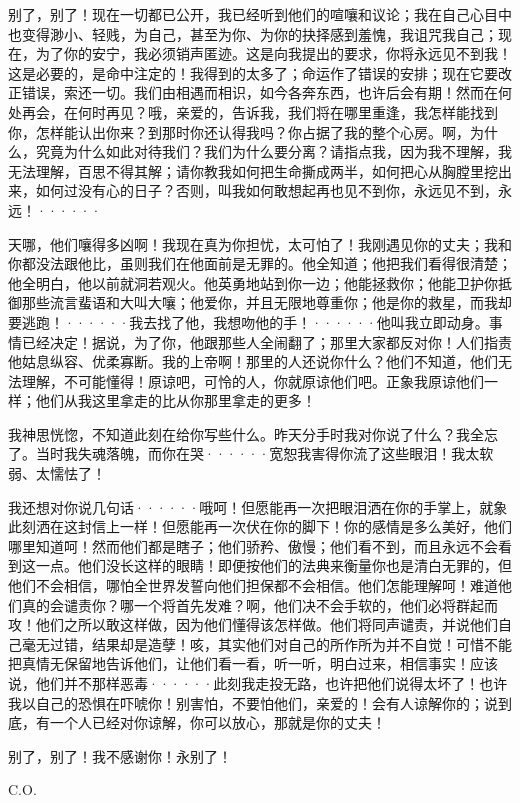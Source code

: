 \documentclass[12pt, UTF8]{ctexbook}
\begin{document}
\par 别了，别了！现在一切都已公开，我已经听到他们的喧嚷和议论；我在自己心目中也变得渺小、轻贱，为自己，甚至为你、为你的抉择感到羞愧，我诅咒我自己；现在，为了你的安宁，我必须销声匿迹。这是向我提出的要求，你将永远见不到我！这是必要的，是命中注定的！我得到的太多了；命运作了错误的安排；现在它要改正错误，索还一切。我们由相遇而相识，如今各奔东西，也许后会有期！然而在何处再会，在何时再见？哦，亲爱的，告诉我，我们将在哪里重逢，我怎样能找到你，怎样能认出你来？到那时你还认得我吗？你占据了我的整个心房。啊，为什么，究竟为什么如此对待我们？我们为什么要分离？请指点我，因为我不理解，我无法理解，百思不得其解；请你教我如何把生命撕成两半，如何把心从胸膛里挖出来，如何过没有心的日子？否则，叫我如何敢想起再也见不到你，永远见不到，永远！······
\par 天哪，他们嚷得多凶啊！我现在真为你担忧，太可怕了！我刚遇见你的丈夫；我和你都没法跟他比，虽则我们在他面前是无罪的。他全知道；他把我们看得很清楚；他全明白，他以前就洞若观火。他英勇地站到你一边；他能拯救你；他能卫护你抵御那些流言蜚语和大叫大嚷；他爱你，并且无限地尊重你；他是你的救星，而我却要逃跑！······我去找了他，我想吻他的手！······他叫我立即动身。事情已经决定！据说，为了你，他跟那些人全闹翻了；那里大家都反对你！人们指责他姑息纵容、优柔寡断。我的上帝啊！那里的人还说你什么？他们不知道，他们无法理解，不可能懂得！原谅吧，可怜的人，你就原谅他们吧。正象我原谅他们一样；他们从我这里拿走的比从你那里拿走的更多！
\par 我神思恍惚，不知道此刻在给你写些什么。昨天分手时我对你说了什么？我全忘了。当时我失魂落魄，而你在哭······宽恕我害得你流了这些眼泪！我太软弱、太懦怯了！
\par 我还想对你说几句话······哦呵！但愿能再一次把眼泪洒在你的手掌上，就象此刻洒在这封信上一样！但愿能再一次伏在你的脚下！你的感情是多么美好，他们哪里知道呵！然而他们都是瞎子；他们骄矜、傲慢；他们看不到，而且永远不会看到这一点。他们没长这样的眼睛！即便按他们的法典来衡量你也是清白无罪的，但他们不会相信，哪怕全世界发誓向他们担保都不会相信。他们怎能理解呵！难道他们真的会谴责你？哪一个将首先发难？啊，他们决不会手软的，他们必将群起而攻！他们之所以敢这样做，因为他们懂得该怎样做。他们将同声谴责，并说他们自己毫无过错，结果却是造孽！咳，其实他们对自己的所作所为并不自觉！可惜不能把真情无保留地告诉他们，让他们看一看，听一听，明白过来，相信事实！应该说，他们并不那样恶毒······此刻我走投无路，也许把他们说得太坏了！也许我以自己的恐惧在吓唬你！别害怕，不要怕他们，亲爱的！会有人谅解你的；说到底，有一个人已经对你谅解，你可以放心，那就是你的丈夫！
\par 别了，别了！我不感谢你！永别了！
\par  C.O.
\end{document}
